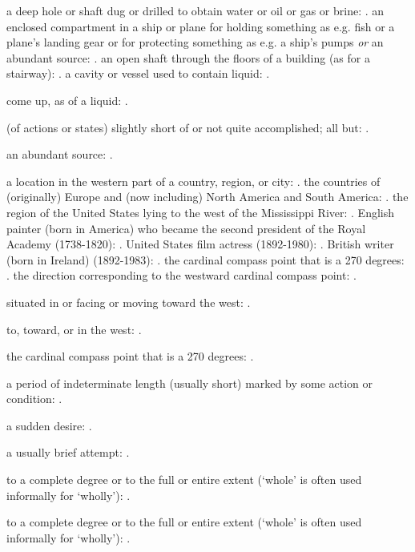   a deep hole or shaft dug or drilled to obtain water or oil or gas or brine: . an enclosed compartment in a ship or plane for holding something as e.g. fish or a plane's landing gear or for protecting something as e.g. a ship's pumps \textit{or} an abundant source: . an open shaft through the floors of a building (as for a stairway): . a cavity or vessel used to contain liquid: .

  come up, as of a liquid: .

  (of actions or states) slightly short of or not quite accomplished; all but: .

  an abundant source: .

  a location in the western part of a country, region, or city: . the countries of (originally) Europe and (now including) North America and South America: . the region of the United States lying to the west of the Mississippi River: . English painter (born in America) who became the second president of the Royal Academy (1738-1820): . United States film actress (1892-1980): . British writer (born in Ireland) (1892-1983): . the cardinal compass point that is a 270 degrees: . the direction corresponding to the westward cardinal compass point: .

  situated in or facing or moving toward the west: .

  to, toward, or in the west: .

  the cardinal compass point that is a 270 degrees: .

  a period of indeterminate length (usually short) marked by some action or condition: .

  a sudden desire: .

  a usually brief attempt: .

  to a complete degree or to the full or entire extent (`whole' is often used informally for `wholly'): .

  to a complete degree or to the full or entire extent (`whole' is often used informally for `wholly'): .

